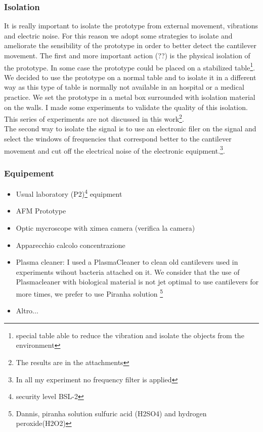 \documentclass[11pt, a4paper]{article}
\begin{document}
\subsubsection{Isolation}
It is really important to isolate the prototype from external movement, vibrations and electric noise. For this reason we adopt some strategies to isolate and ameliorate the sensibility of the prototype in order to better detect the cantilever movement. 
The first and more important action (??) is the physical isolation of the prototype. In some case the prototype could be placed on a stabilized table\footnote{special table able to reduce the vibration and isolate the objects from the environment}. We decided to use the prototype on a normal table and to isolate it in a different way as this type of table is normally not available in an hospital or a medical practice. We set the prototype in a metal box surrounded with isolation material on the walls. I made some experiments to validate the quality of this isolation. This series of experiments are not discussed in this work\footnote{The results are in the attachments}. 
\\
The second way to isolate the signal is to use an electronic filer on the signal and select the windows of frequencies that correspond better to the cantilever movement and cut off the electrical noise of the electronic equipment.\footnote{In all my experiment no frequency filter is applied}.


\subsubsection{Equipement}%
\begin{itemize}
	\item Usual laboratory (P2)\footnote{security level BSL-2} equipment
    \item AFM Prototype 
    \item Optic mycroscope with ximea camera (verifica la camera)
    \item Apparecchio calcolo concentrazione 
    \item Plasma cleaner: I used a PlasmaCleaner to clean old cantilevers used in experiments wihout bacteria attached on it. We consider that the use of Plasmacleaner with biological material is not jet optimal to use cantilevers for more times, we prefer to use Piranha solution \footnote{Dannis, piranha solution sulfuric acid (H2SO4) and hydrogen peroxide(H2O2)}
    \item Altro...
      \end{itemize}
      
\end{document}
